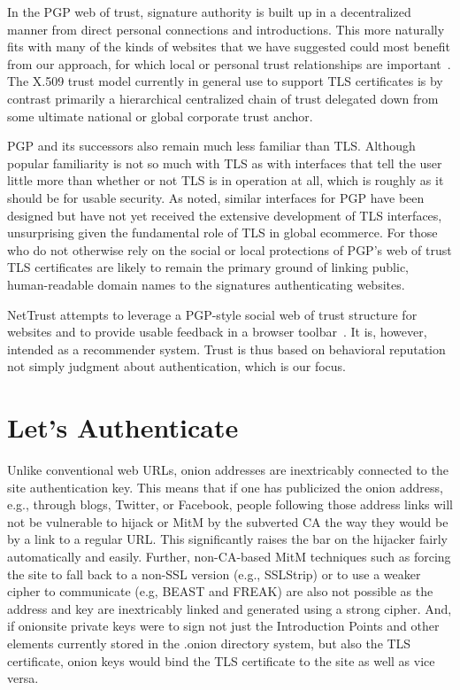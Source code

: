 \documentclass[10pt, conference, compsocconf]{styles/IEEEtran}
\begin{document}
In the PGP web of trust, signature authority is built up in a
decentralized manner from direct personal connections and
introductions. This more naturally fits with many of the kinds of
websites that we have suggested could most benefit from our approach,
for which local or personal trust relationships are
important~\cite{zimmerman}.  The X.509 trust model currently in
general use to support TLS certificates is by contrast primarily a
hierarchical centralized chain of trust delegated down from some
ultimate national or global corporate trust anchor.

PGP and its successors also remain much less familiar than
TLS. Although popular familiarity is not so much with TLS as with
interfaces that tell the user little more than whether or not TLS is
in operation at all, which is roughly as it should be for usable
security. As noted, similar interfaces for PGP have been designed but
have not yet received the extensive development of TLS interfaces,
unsurprising given the fundamental role of TLS in global ecommerce.
For those who do not otherwise rely on the social or local protections
of PGP's web of trust TLS certificates are likely to remain the
primary ground of linking public, human-readable domain names to the
signatures authenticating websites.

NetTrust attempts to leverage a PGP-style social web of trust
structure for websites and to provide usable feedback in a browser
toolbar~\cite{nettrust}. It is, however, intended as a recommender
system. Trust is thus based on behavioral reputation not
simply judgment about authentication, which is our focus.


\section{Let's Authenticate}
\label{lets-auth}

Unlike conventional web URLs, onion addresses are inextricably
connected to the site authentication key. This means that if one has
publicized the onion address, e.g., through blogs, Twitter, or
Facebook, people following those address links will not be vulnerable
to hijack or MitM by the subverted CA the way they would be by a link
to a regular URL\@. This significantly raises the bar on the hijacker
fairly automatically and easily. Further, non-CA-based MitM techniques
such as forcing the site to fall back to a non-SSL version (e.g.,
SSLStrip) or to use a weaker cipher to communicate (e.g, BEAST and
FREAK) are also not possible as the address and key are inextricably
linked and generated using a strong cipher. And, if onionsite private
keys were to sign not just the Introduction Points and other elements
currently stored in the .onion directory system, but also the TLS
certificate, onion keys would bind the TLS certificate to the site as
well as vice versa. 
\end{document}
